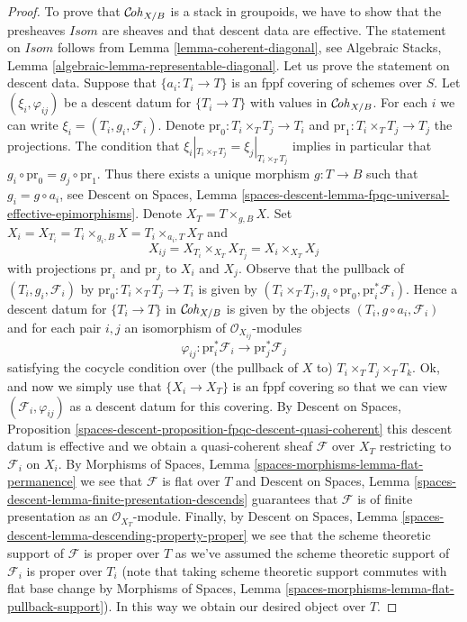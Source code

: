 \begin{proof}
To prove that $\mathcal{C}\!\mathit{oh}_{X/B}$ is a stack in groupoids, we have to show
that the presheaves $\mathit{Isom}$ are sheaves and that descent data are
effective. The statement on $\mathit{Isom}$ follows from
Lemma \ref{lemma-coherent-diagonal}, see
Algebraic Stacks, Lemma \ref{algebraic-lemma-representable-diagonal}.
Let us prove the statement on descent data.
Suppose that $\{a_i : T_i \to T\}$ is an fppf covering of schemes over $S$.
Let $(\xi_i, \varphi_{ij})$ be a descent datum for $\{T_i \to T\}$
with values in $\mathcal{C}\!\mathit{oh}_{X/B}$.
For each $i$ we can write $\xi_i = (T_i, g_i, \mathcal{F}_i)$.
Denote $\text{pr}_0 : T_i \times_T T_j \to T_i$ and
$\text{pr}_1 : T_i \times_T T_j \to T_j$ the projections.
The condition that $\xi_i|_{T_i \times_T T_j} = \xi_j|_{T_i \times_T T_j}$
implies in particular that $g_i \circ \text{pr}_0 = g_j \circ \text{pr}_1$.
Thus there exists a unique morphism $g : T \to B$ such that
$g_i = g \circ a_i$, see
Descent on Spaces, Lemma
\ref{spaces-descent-lemma-fpqc-universal-effective-epimorphisms}.
Denote $X_T = T \times_{g, B} X$. Set
$X_i = X_{T_i} = T_i \times_{g_i, B} X = T_i \times_{a_i, T} X_T$
and
$$
X_{ij} = X_{T_i} \times_{X_T} X_{T_j} = X_i \times_{X_T} X_j
$$
with projections $\text{pr}_i$ and $\text{pr}_j$ to $X_i$ and $X_j$.
Observe that the pullback of $(T_i, g_i, \mathcal{F}_i)$
by $\text{pr}_0 : T_i \times_T T_j \to T_i$ is given by
$(T_i \times_T T_j, g_i \circ \text{pr}_0, \text{pr}_i^*\mathcal{F}_i)$.
Hence a descent datum for $\{T_i \to T\}$ in $\mathcal{C}\!\mathit{oh}_{X/B}$
is given by the objects $(T_i, g \circ a_i, \mathcal{F}_i)$
and for each pair $i, j$ an isomorphism of $\mathcal{O}_{X_{ij}}$-modules
$$
\varphi_{ij} :
\text{pr}_i^*\mathcal{F}_i \longrightarrow \text{pr}_j^*\mathcal{F}_j
$$
satisfying the cocycle condition over (the pullback of $X$ to)
$T_i \times_T T_j \times_T T_k$.
Ok, and now we simply use that $\{X_i \to X_T\}$ is an fppf covering
so that we can view $(\mathcal{F}_i, \varphi_{ij})$ as a descent datum
for this covering. By
Descent on Spaces, Proposition
\ref{spaces-descent-proposition-fpqc-descent-quasi-coherent}
this descent datum is effective and we obtain a quasi-coherent
sheaf $\mathcal{F}$ over $X_T$ restricting to $\mathcal{F}_i$ on $X_i$.
By Morphisms of Spaces, Lemma \ref{spaces-morphisms-lemma-flat-permanence}
we see that $\mathcal{F}$ is flat over $T$ and
Descent on Spaces, Lemma
\ref{spaces-descent-lemma-finite-presentation-descends}
guarantees that $\mathcal{F}$ is of finite presentation as an
$\mathcal{O}_{X_T}$-module. Finally, by
Descent on Spaces, Lemma \ref{spaces-descent-lemma-descending-property-proper}
we see that the scheme theoretic support of $\mathcal{F}$ is proper over
$T$ as we've assumed the scheme theoretic support of $\mathcal{F}_i$
is proper over $T_i$ (note that taking scheme theoretic support commutes
with flat base change by
Morphisms of Spaces, Lemma \ref{spaces-morphisms-lemma-flat-pullback-support}).
In this way we obtain our desired object over $T$.
\end{proof}

